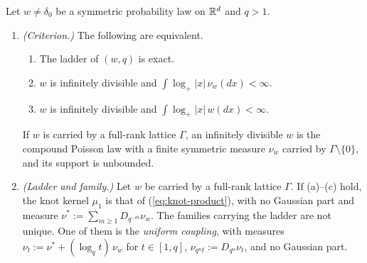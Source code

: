 \begin{proposition}
\label{prop:exact-masks}

Let $w \ne \delta_0$ be a symmetric probability law on $\mathbb{R}^d$ and $q > 1$.
\begin{enumerate}
\item \emph{(Criterion.)} The following are equivalent.
\begin{enumerate}
\item[(a)] The ladder of $(w, q)$ is exact.
\item[(b)] $w$ is infinitely divisible and $\int\log_+|x|\,\nu_w(dx) < \infty$.
\item[(c)] $w$ is infinitely divisible and $\int\log_+|x|\,w(dx) < \infty$.
\end{enumerate}
If $w$ is carried by a full-rank lattice $\Gamma$, an infinitely divisible $w$ is the compound
Poisson law with a finite symmetric \Levy{} measure $\nu_w$ carried by $\Gamma \setminus \{0\}$, and
its support is unbounded.
\item \emph{(Ladder and family.)} Let $w$ be carried by a full-rank lattice $\Gamma$. If (a)--(c)
hold, the knot
kernel $\mu_1$ is that of
(\ref{eq:knot-product}), with no Gaussian part and \Levy{} measure $\nu^* := \sum_{m \ge 1}
D_{q^{-m}}\nu_w$. The families carrying the ladder are not unique. One of them is the
\emph{uniform coupling}, with \Levy{} measures $\nu_t := \nu^* + (\log_qt)\,\nu_w$ for
$t \in [1, q]$, $\nu_{q^nt} := D_{q^n}\nu_t$, and no Gaussian part.
\end{enumerate}
\end{proposition}

